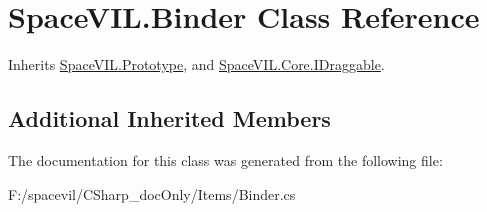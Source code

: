 \hypertarget{class_space_v_i_l_1_1_binder}{}\section{Space\+V\+I\+L.\+Binder Class Reference}
\label{class_space_v_i_l_1_1_binder}


Inherits \mbox{\hyperlink{class_space_v_i_l_1_1_prototype}{Space\+V\+I\+L.\+Prototype}}, and \mbox{\hyperlink{interface_space_v_i_l_1_1_core_1_1_i_draggable}{Space\+V\+I\+L.\+Core.\+I\+Draggable}}.

\subsection*{Additional Inherited Members}


The documentation for this class was generated from the following file\+:\begin{DoxyCompactItemize}
\item 
F\+:/spacevil/\+C\+Sharp\+\_\+doc\+Only/\+Items/Binder.\+cs\end{DoxyCompactItemize}
